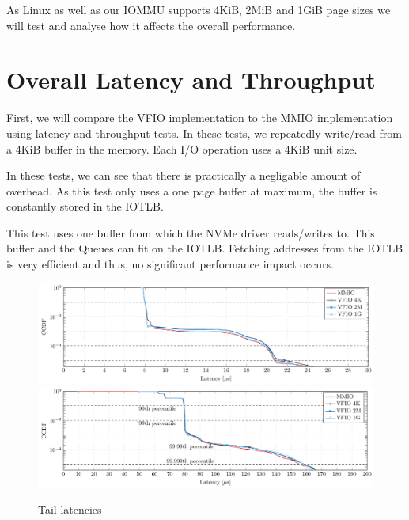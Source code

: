 
As Linux as well as our IOMMU supports 4KiB, 2MiB and 1GiB page sizes we will test and analyse how it affects the overall performance.

\section{Overall Latency and Throughput}
First, we will compare the VFIO implementation to the MMIO implementation using latency and throughput tests. In these tests, we repeatedly write/read from a 4KiB buffer in the memory. Each I/O operation uses a 4KiB unit size.

In these tests, we can see that there is practically a negligable amount of overhead. As this test only uses a one page buffer at maximum, the buffer is constantly stored in the IOTLB.

This test uses one buffer from which the NVMe driver reads/writes to. This buffer and the Queues can fit on the IOTLB. Fetching addresses from the IOTLB is very efficient and thus, no significant performance impact occurs.

\begin{figure}
    \centering
     {\includegraphics[width=\textwidth]{figures/latency_ccdf_write} \label{fig:ccdf-write}}
     {\includegraphics[width=\textwidth]{figures/latency_ccdf_read} \label{fig:ccdf-read}}
    \caption{Tail latencies}
    \label{fig:ccdf}
\end{figure}

